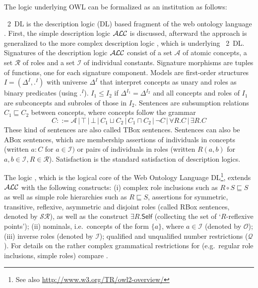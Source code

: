 \documentclass[10pt, a4paper]{isov2}
\makeatletter
\newcommand*\CommentAuthor{}
\renewcommand*\CommentAuthor{#1}}
\newcommand*\CommentDate{}
\renewcommand*\CommentDate{#1}}
\newcommand*\CommentId{}
\renewcommand*\CommentId{#1}}
\newcommand*\CommentType{}
\renewcommand*\CommentType{#1}}
\newcommand*{\SetCommentColorByType}[1]{%
\edef\localType{{#1}}%
\expandafter\ifstrequal\localType{q-aut}{\colorlet{CommentColor}{red}}{%
\expandafter\ifstrequal\localType{q-all}{\colorlet{CommentColor}{orange}}{%
\expandafter\ifstrequal\localType{todo}{\colorlet{CommentColor}{orange}}{%
\expandafter\ifstrequal\localType{fyi}{\colorlet{CommentColor}{lightgray}}{%
\colorlet{CommentColor}{yellow}}}}}}
\newcommand*{\SetCommentPrefixByType}[1]{%
\edef\localType{{#1}}%
\expandafter\@ifmtarg\localType{%
\edef\CommentPrefix{}%
}{%
\caseupper[q]{#1}%
\edef\CommentPrefix{\thestring: }%
}}
\newcommand*{\initComment}[1]{%
\setkeys{Comment}{#1}%
\SetCommentColorByType{\CommentType}%
\relax%
\SetCommentPrefixByType{\CommentType}%
\relax%
}
\newcommand*{\todonote}[2][]{%
\initComment{#1}%
\pdfcomment[author=\CommentAuthor,color=CommentColor,date=\CommentDate,id=\CommentId]{%
\CommentPrefix
#2}}
\renewcommand*{\todonote}[2][]{%
\initComment{#1}%
\ednote{\CommentPrefix #2}}
\newcommand*{\CLnote}[2][author=Christoph Lange]{%
\todonote[author=Christoph Lange,#1]{#2}}
\newcommand*{\DOL}{\ensuremath{\mathsf{DOL}}\xspace}
\makeatother
\begin{document}
\sclause{Semantic Conformance of OWL 2 With \DOL}\label{a:owl-logic}


 The logic \SROIQ underlying 
OWL can be formalized as an institution as follows:
\begin{definition}\label{DL}  
\OWL~2~DL is the description logic (DL) based fragment of the web ontology language \OWL. 
 First, the simple description logic $\mathcal{ALC}$ is discussed, afterward the approach is generalized
to the more complex description logic \SROIQ{}, which is underlying \OWL~2~DL.
Signatures of the description logic $\mathcal{ALC}$ consist of a set  ${\mathcal A}$ of
atomic concepts, a set ${\mathcal R}$ of roles and a set ${\mathcal
I}$ of individual constants. Signature morphisms are tuples of
functions, one for each signature component.
Models are  first-order structures $I = (\Delta^I, .^I)$ with universe $\Delta^I$
that interpret concepts as unary and roles as binary predicates
(using $.^I$). $I_1\leq I_2$ if $\Delta^{I_1}=\Delta^{I_2}$ and all
concepts and roles of $I_1$ are subconcepts and subroles of those in $I_2$.
Sentences are subsumption relations $C_1\sqsubseteq C_2$ between
concepts, where concepts follow the grammar
$$C ::= {\mathcal A} \,|\, \top\,|\, \bot \,|\, C_1 \sqcup C_2 \,|\, C_1 \sqcap C_2 \,|\, \neg C 
    \,|\, \forall R . C \,|\, \exists R . C$$
These kind of sentences are also called TBox sentences.
 Sentences can also be ABox sentences, which are
membership assertions of individuals in concepts (written $a:C$ for
$a\in{\mathcal I})$ or pairs of individuals in roles (written $R(a,b)$
for $a,b\in{\mathcal I}, R\in{\mathcal R}$).   Satisfaction is the
standard satisfaction of description logics.

The logic \SROIQ \cite{SROIQ}, which is the logical core of the Web Ontology
Language  DL\footnote{See also \url{http://www.w3.org/TR/owl2-overview/}}, extends $\mathcal{ALC}$
with the following constructs: (i) complex role inclusions such as $R \circ S \sqsubseteq S$
as well as simple role hierarchies such as $R \sqsubseteq S$,
assertions for symmetric, transitive, reflexive, asymmetric and
disjoint roles (called RBox sentences, denoted by $\mathcal{SR}$), as well as the construct
$\exists R . \mathsf{Self}$ (collecting the set of `$R$-reflexive
points'); (ii) nominals, i.e.\ concepts of the form $\{a\}$, where $a\in\mathcal{I}$ (denoted by $\mathcal{O}$); (iii) inverse
roles (denoted by $\mathcal{I}$); qualified and unqualified number
restrictions ($\mathcal{Q}$). For details on the rather complex
grammatical restrictions for \SROIQ (e.g.\ regular role inclusions,
simple roles) compare \cite{SROIQ}.


\end{definition}
\end{document}
